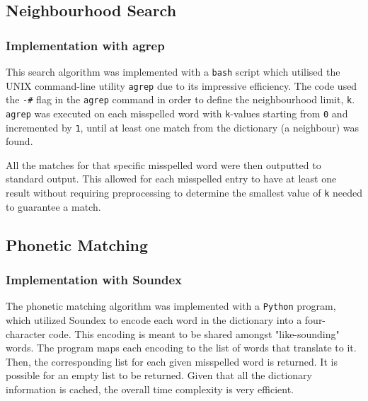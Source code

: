 \documentclass[11pt]{article}
\begin{document}



\subsection{Neighbourhood Search}
\subsubsection{Implementation with agrep}
This search algorithm was implemented with a \texttt{bash} script which utilised the UNIX command-line utility \texttt{agrep}  %
 due to its impressive efficiency. The code used the \texttt{-\#} flag in the \texttt{agrep} command in order to define the neighbourhood limit, \texttt{k}. \texttt{agrep} was executed on each misspelled word with \texttt{k}-values starting from \texttt{0} and incremented by \texttt{1}, until at least one match from the dictionary (a neighbour) was found.

All the matches for that specific misspelled word were then outputted to standard output. This allowed for each misspelled entry to have at least one result without requiring preprocessing to determine the smallest value of \texttt{k} needed to guarantee a match.


\subsection{Phonetic Matching}

\subsubsection{Implementation with Soundex}
The phonetic matching algorithm was implemented with a \texttt{Python} program, which utilized Soundex %
to encode each word in the dictionary into a four-character code. This encoding is meant to be shared amongst "like-sounding" words. %
The program maps each encoding to the list of words that translate to it. Then, the corresponding list for each given misspelled word is returned. It is possible for an empty list to be returned. Given that all the dictionary information is cached, the overall time complexity is very efficient.
\end{document}
